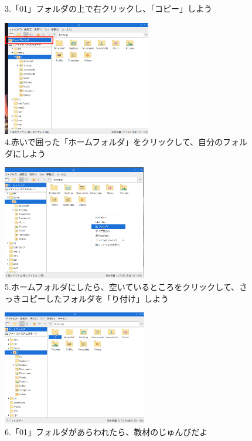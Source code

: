 \documentclass[a4paper,12pt]{jarticle}
\begin{document}
\begin{figure}
\begin{minipage}{\textwidth}
\begin{minipage}{0.45\linewidth}
      3.「01」フォルダの上で右クリックし、「コピー」しよう
    \end{minipage}
    \hfill
    \vspace{20pt}
    \begin{minipage}{0.45\linewidth}
      \includegraphics[width=\linewidth,height=5cm]{textbook-img1013.png}\\
      4.赤いで囲った「ホームフォルダ」をクリックして、自分のフォルダにしよう
    \end{minipage}    \begin{minipage}{0.45\linewidth}
      \includegraphics[width=\linewidth,height=5cm]{textbook-img1014.png}\\
      5.ホームフォルダにしたら、空いているところをクリックして、さっきコピーしたフォルダを「り付け」しよう
    \end{minipage}
    \hfill
    \vspace{20pt}
    \begin{minipage}{0.45\linewidth}
      \includegraphics[width=\linewidth,height=5cm]{textbook-img1015.png}\\
      6.「01」フォルダがあらわれたら、教材のじゅんびだよ
    \end{minipage}

  \end{minipage}

  \bigskip

\end{figure}
\end{document}
